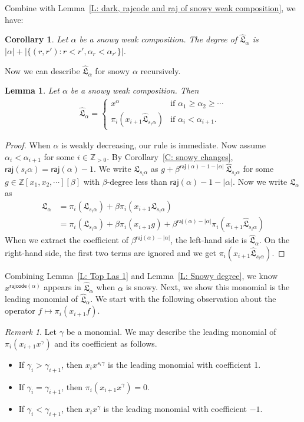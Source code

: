 \documentclass[10pt]{amsart}
\theoremstyle{plain}
\newtheorem{cor}[cor]{Corollary}
\theoremstyle{plain}
\theoremstyle{definition}
\theoremstyle{definition}
\theoremstyle{definition}
\theoremstyle{plain}
\theoremstyle{plain}
\theoremstyle{plain}
\newtheorem{lemma}[lemma]{Lemma}
\theoremstyle{plain}
\theoremstyle{plain}
\theoremstyle{remark}
\newtheorem{rem}[rem]{Remark}
\theoremstyle{remark}
\theoremstyle{plain}
\theoremstyle{plain}
\newcommand{\fL}{\mathfrak{L}}
\newcommand{\fLb}{\fL}
\newcommand{\topLas}{\widehat{\fL}}
\newcommand{\Z}{\mathbb{Z}}
\newcommand{\rajcode}{\mathsf{rajcode}}
\newcommand{\raj}{\mathsf{raj}}
\begin{document}
Combine with Lemma~\ref{L: dark, rajcode and raj of snowy weak composition},
we have: 
\begin{cor}
Let $\alpha$ be a snowy weak composition.
The degree of $\topLas_\alpha$
is $|\alpha| + |\{(r, r'): r < r', \alpha_r < \alpha_{r'}\}|$.
\end{cor}

Now we can describe $\topLas_\alpha$ for snowy 
$\alpha$ recursively.
\begin{lemma}\label{L: recursive top Las}
Let $\alpha$ be a snowy weak composition. 
Then
\begin{align}
\topLas_\alpha = \begin{cases}
x^\alpha & \text{if $\alpha_1 \geqslant \alpha_2 \geqslant \cdots$} \\
\pi_i (x_{i+1} \topLas_{s_i\alpha}) &\text{if $\alpha_i<\alpha_{i+1}$.}
\end{cases}
\end{align}
\end{lemma}
\begin{proof}
When $\alpha$ is weakly decreasing, 
our rule is immediate.
Now assume $\alpha_i < \alpha_{i+1}$ for some $i\in \Z_{>0}$.
By Corollary~\ref{C: snowy changes},
$\raj(s_i \alpha) = \raj(\alpha) - 1$.
We write $\fLb_{s_i \alpha}$
as $g + \beta^{\raj(\alpha) - 1 - |\alpha|} \: \topLas_{s_i \alpha}$
for some $g \in \Z[x_1, x_2, \cdots][\beta]$
with $\beta$-degree less than 
$\raj(\alpha) - 1 - |\alpha|$.
Now we write $\fLb_\alpha$ as
\begin{align*}
\fLb_\alpha & = \pi_i(\fLb_{s_i \alpha}) 
+ \beta \pi_i(x_{i+1}\fLb_{s_i \alpha})  \\ 
& =\pi_i(\fLb_{s_i \alpha})
+ \beta \pi_i(x_{i+1}g) + \beta^{\raj(\alpha) - |\alpha|} \pi_i(x_{i+1}\topLas_{s_i \alpha})   
\end{align*}
When we extract the coefficient of $\beta^{\raj(\alpha) - |\alpha|}$,
the left-hand side is $\topLas_\alpha$.
On the right-hand side, 
the first two terms are ignored and 
we get $\pi_i(x_{i+1}\topLas_{s_i \alpha})$.
\end{proof}

Combining Lemma~\ref{L: Top Las 1} and Lemma~\ref{L: Snowy degree},
we know $x^{\rajcode(\alpha)}$ appears in $\topLas_\alpha$
when $\alpha$ is snowy. 
Next, we show this monomial
is the leading monomial of $\topLas_\alpha$.
We start with the following observation 
about the operator $f \mapsto \pi_i(x_{i+1} f)$.
\begin{rem}
\label{R: leading}
Let $\gamma$ be a monomial.
We may describe the leading monomial of
$\pi_i(x_{i+1}x^\gamma)$ and its coefficient as follows. 
\begin{itemize}
\item If $\gamma_i > \gamma_{i+1}$,
then $x_i x^{s_i \gamma}$ is the leading monomial
with coefficient 1.
\item If $\gamma_i = \gamma_{i+1}$,
then $\pi_i(x_{i+1}x^\gamma) = 0$. 
\item If $\gamma_i < \gamma_{i+1}$,
then $x_i x^\gamma$ is the leading monomial 
with coefficient $-1$. 
\end{itemize}
\end{rem}
\end{document}
